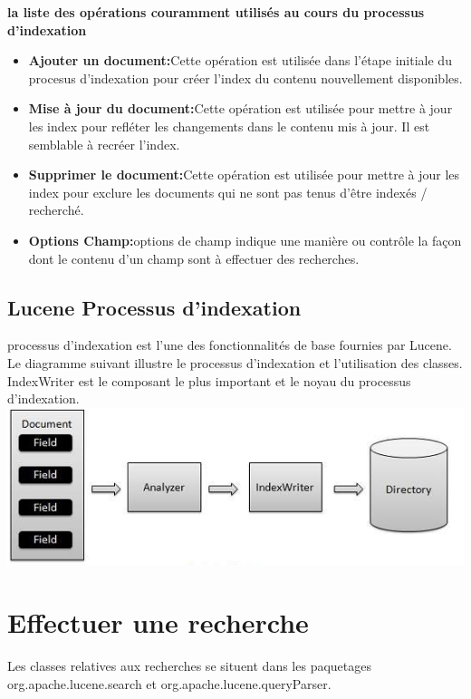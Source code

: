 \documentclass[12pt]{report}
\begin{document}
\begin{frame}
\newline
\textbf{la liste des opérations couramment utilisés au cours du processus d'indexation}\newline
\begin{itemize}
\item \textbf{Ajouter un document:}Cette opération est utilisée dans l'étape initiale du procesus d'indexation pour créer l'index du contenu nouvellement disponibles.
\item \textbf{Mise à jour du document:}Cette opération est utilisée pour mettre à jour les index pour refléter les changements dans le contenu mis à jour. Il est semblable à recréer l'index.
\item \textbf{Supprimer le document:}Cette opération est utilisée pour mettre à jour les index pour exclure les documents qui ne sont pas tenus d'être indexés / recherché.
\item \textbf{Options Champ:}options de champ indique une manière ou contrôle la façon dont le contenu d'un champ sont à effectuer des recherches.
\end{itemize}
\end{frame}
\newpage
\subsection{Lucene Processus d'indexation}
processus d'indexation est l'une des fonctionnalités de base fournies par Lucene. Le diagramme suivant illustre le processus d'indexation et l'utilisation des classes. IndexWriter est le composant le plus important et le noyau du processus d'indexation.
\newline\newline
 \includegraphics[height=\dimexpr4\textheight/16\relax]{2}


\section{Effectuer une recherche}
Les classes relatives aux recherches se situent dans les paquetages org.apache.lucene.search et org.apache.lucene.queryParser.
\end{document}
